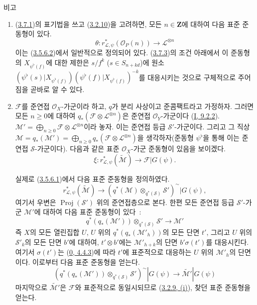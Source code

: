 \begin{namedtheorem}[3.7.9]{비고}
\label{II.3.7.9-ko}
\begin{enumerate}
  \item[(i)] (\hyperref[II.3.7.1-ko]{3.7.1})의 표기법을 쓰고
    (\hyperref[II.3.2.10-ko]{3.2.10})을 고려하면, 모든
    $n\in\mathbf{Z}$에 대하여 다음 표준 준동형이 있다.
    \[
    \label{II.3.7.9.1-ko}
      \theta:r_{\mathcal{L},\psi}^*(\mathcal{O}_P(n))\longrightarrow
      \mathcal{L}^{\otimes n}
    \tag{3.7.9.1}
    \]
    이는 (\hyperref[II.3.5.6.2-ko]{3.5.6.2})에서 일반적으로 정의되어
    있다. (\hyperref[II.3.7.3-ko]{3.7.3})의 조건 아래에서 이 준동형의
    $X_{\psi^\flat(f)}$에 대한 제한은 $s/f^k$ ($s\in S_{n+kd}$)에 원소
    $(\psi^\flat(s)|X_{\psi^\flat(f)})
    (\psi^\flat(f)|X_{\psi^\flat(f)})^{-k}$를 대응시키는 것으로
    구체적으로 주어짐을 곧바로 알 수 있다.
  \item[(ii)] $\mathcal{F}$를 준연접 $\mathcal{O}_X$-가군이라 하고,
    $q$가 분리 사상이고 준콤팩트라고 가정하자. 그러면 모든
    $n\geq0$에 대하여 $q_*(\mathcal{F}\otimes\mathcal{L}^{\otimes n})$은
    준연접 $\mathcal{O}_Y$-가군이다
    (\hyperref[I.9.2.2-ko]{I, 9.2.2}).
    $\mathcal{M}'=\bigoplus_{n\geq0}\mathcal{F}\otimes
    \mathcal{L}^{\otimes n}$이라 놓자. 이는 준연접 등급
    $\mathcal{S}'$-가군이다. 그리고 그 직상
    $\mathcal{M}=q_*(\mathcal{M}')=
    \bigoplus_{n\geq0}q_*(\mathcal{F}\otimes\mathcal{L}^{\otimes n})$을
    생각하자(준동형 $\psi^\flat$을 통해 이는 준연접
    $\mathcal{S}$-가군이다). 다음과 같은 표준 $\mathcal{O}_X$-가군
    준동형이 있음을 보이겠다.
    \[
    \label{II.3.7.9.2-ko}
      \xi:r_{\mathcal{L},\psi}^*(\widetilde{\mathcal{M}})
      \longrightarrow\mathcal{F}|G(\psi).
    \tag{3.7.9.2}
    \]

    실제로 (\hyperref[II.3.5.6.1-ko]{3.5.6.1})에서 다음 표준 준동형을
    정의하였다.
    \[
    \label{II.3.7.9.3-ko}
      r_{\mathcal{L},\psi}^*(\widetilde{\mathcal{M}})
      \longrightarrow
      (q^*(\mathcal{M})\otimes_{q^*(\mathcal{S})}\mathcal{S}')^{\sim}
      |G(\psi),
    \tag{3.7.9.3}
    \]
    여기서 우변은 $\operatorname{Proj}(\mathcal{S}')$ 위의 준연접층으로
    본다. 한편 모든 준연접 등급 $\mathcal{S}'$-가군 $\mathcal{M}'$에
    대하여 다음 표준 준동형이 있다~:
    \[
    \label{II.3.7.9.4-ko}
      q^*(q_*(\mathcal{M}'))\otimes_{q^*(\mathcal{S})}\mathcal{S}'
      \longrightarrow\mathcal{M}'
    \tag{3.7.9.4}
    \]
    즉 $X$의 모든 열린집합 $U$, $U$ 위의
    $q^*(q_*(\mathcal{M}'_h))$의 모든 단면 $t'$, 그리고 $U$ 위의
    $\mathcal{S}'_k$의 모든 단면 $b'$에 대하여, $t'\otimes b'$에는
    $\mathcal{M}'_{h+k}$의 단면 $b'\sigma(t')$를 대응시킨다. 여기서
    $\sigma(t')$는 (\hyperref[0.4.4.3-ko]{0, 4.4.3})에 따라 $t'$에
    표준적으로 대응하는 $U$ 위의 $\mathcal{M}'_h$의 단면이다. 이로부터
    다음 표준 준동형을 얻는다.
    \[
    \label{II.3.7.9.5-ko}
      (q^*(q_*(\mathcal{M}'))\otimes_{q^*(\mathcal{S})}\mathcal{S}')^{\sim}
      |G(\psi)\longrightarrow\widetilde{\mathcal{M}'}|G(\psi)
    \tag{3.7.9.5}
    \]
    마지막으로 $\widetilde{\mathcal{M}'}$은 $\mathcal{F}$와 표준적으로
    동일시되므로 (\hyperref[II.3.2.9-ko]{3.2.9, (i)}), 찾던 표준
    준동형을 얻는다.


\end{enumerate}
\end{namedtheorem}
